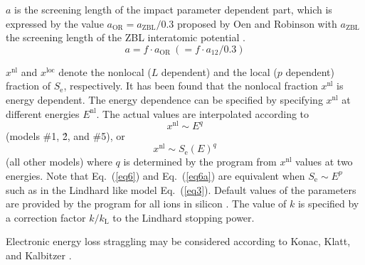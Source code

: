 $a$ is the screening length of the impact parameter dependent part, which 
is expressed by the value $a_\mathrm{OR}=a_\mathrm{ZBL}/0.3$ proposed by Oen and
Robinson \cite{I7607} with $a_\mathrm{ZBL}$ the screening length of the ZBL
interatomic potential \cite{I8512}.
%
\begin{equation}
   a = f \cdot a_\mathrm{OR} ~( = f \cdot a_{12} / 0.3 )
   \label{eq5}
\end{equation}
%

$x^\mathrm{nl}$ and $x^\mathrm{loc}$ denote the nonlocal ($L$ dependent) and the
local ($p$ dependent) fraction of $S_\mathrm{e}$, respectively.
It has been found that the nonlocal fraction $x^\mathrm{nl}$ is energy
dependent. The energy dependence can be specified by specifying $x^\mathrm{nl}$
at different energies $E^\mathrm{nl}$. The actual values are interpolated
according to
%
\begin{equation}
   x^\mathrm{nl} \sim E^q
   \label{eq6a}
\end{equation}
%
(models \#1, \'2, and \#5), or
%
\begin{equation}
   x^\mathrm{nl} \sim S_\mathrm{e}(E)^q
   \label{eq6}
\end{equation}
%
(all other models) where $q$ is determined by the program from
$x^\mathrm{nl}$ values at two energies. Note that Eq.~(\ref{eq6}) and
Eq.~(\ref{eq6a}) are equivalent when $S_\mathrm{e} \sim E^p$ such as in the 
Lindhard like model Eq.~(\ref{eq3}). 
Default values of the parameters are provided by the program for all ions in
silicon \cite{hobler_monte_1995, hobler_towards_2000, hobler_boron_1995,
simionescu_modeling_1995, hobler_electronic_1993, hobler_random_2006}.
The value of $k$ is specified by a correction factor $k/k_\mathrm{L}$ to the
Lindhard stopping power. 

Electronic energy loss straggling may be considered according to Konac, Klatt,
and Kalbitzer \cite{hobler_random_2006, I9848}.

